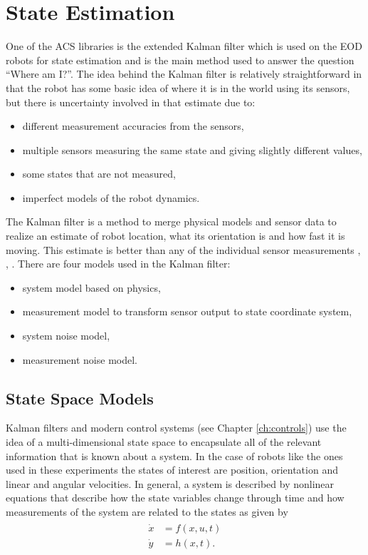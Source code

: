 \chapter{State Estimation}
\label{ch:estimation}
One of the ACS libraries is the extended Kalman filter which is used on the EOD robots for state estimation and is the main method used to answer the question ``Where am I?''. The idea behind the Kalman filter is relatively straightforward in that the robot has some basic idea of where it is in the world using its sensors, but there is uncertainty involved in that estimate due to:
\begin{itemize}
\item different measurement accuracies from the sensors,
\item multiple sensors measuring the same state and giving slightly different values,
\item some states that are not measured,
\item imperfect models of the robot dynamics.
\end{itemize}

The Kalman filter is a method to merge physical models and sensor data to realize an estimate of robot location, what its orientation is and how fast it is moving. This estimate is better than any of the individual sensor measurements \cite{Simon06OptimalEstimation}, \cite{Grewal08}, \cite{Orderud05}. There are four models used in the Kalman filter:
\begin{itemize}
\item system model based on physics,
\item measurement model to transform sensor output to state coordinate system,
\item system noise model,
\item measurement noise model.
\end{itemize}

\section{State Space Models}
\label{sec:statespacemodels}
Kalman filters and modern control systems (see Chapter \ref{ch:controls}) use the idea of a multi-dimensional state space to encapsulate all of the relevant information that is known about a system. In the case of robots like the ones used in these experiments the states of interest are position, orientation and linear and angular velocities. In general, a system is described by nonlinear equations that describe how the state variables change through time and how measurements of the system are related to the states as given by
\begin{align}
\label{eq:statespace}
\begin{split}
\dot{x} &= f(x,u,t) \\
\dot{y} &= h(x,t).
\end{split}
\end{align}

